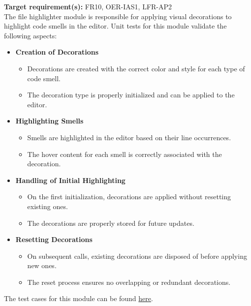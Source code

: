 \documentclass[12pt, titlepage]{article}
\begin{document}
\textbf{Target requirement(s):} FR10, OER-IAS1, LFR-AP2~\cite{SRS} \\

\noindent
The file highlighter module is responsible for applying visual decorations to highlight code smells in the editor. Unit tests for this module validate the following aspects:

\begin{itemize}
  \item \textbf{Creation of Decorations}
  \begin{itemize}
    \item Decorations are created with the correct color and style for each type of code smell.
    \item The decoration type is properly initialized and can be applied to the editor.
  \end{itemize}

  \item \textbf{Highlighting Smells}
  \begin{itemize}
      \item Smells are highlighted in the editor based on their line occurrences.
      \item The hover content for each smell is correctly associated with the decoration.
  \end{itemize}

  \item \textbf{Handling of Initial Highlighting}
  \begin{itemize}
      \item On the first initialization, decorations are applied without resetting existing ones.
      \item The decorations are properly stored for future updates.
  \end{itemize}

  \item \textbf{Resetting Decorations}
  \begin{itemize}
      \item On subsequent calls, existing decorations are disposed of before applying new ones.
      \item The reset process ensures no overlapping or redundant decorations.
  \end{itemize}
\end{itemize}

\noindent The test cases for this module can be found \href{https://github.com/ssm-lab/capstone--sco-vs-code-plugin/blob/plugin-multi-file/test/ui/fileHighlighter.test.ts}{here}.
\end{document}
